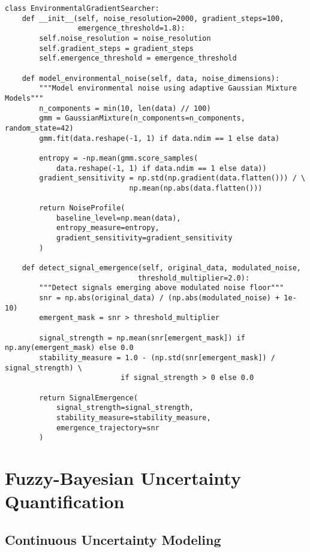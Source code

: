 \documentclass[12pt,a4paper]{article}
\begin{document}
\begin{lstlisting}[style=pythonstyle, caption=Environmental Gradient Search Implementation]
class EnvironmentalGradientSearcher:
    def __init__(self, noise_resolution=2000, gradient_steps=100, 
                 emergence_threshold=1.8):
        self.noise_resolution = noise_resolution
        self.gradient_steps = gradient_steps  
        self.emergence_threshold = emergence_threshold
        
    def model_environmental_noise(self, data, noise_dimensions):
        """Model environmental noise using adaptive Gaussian Mixture Models"""
        n_components = min(10, len(data) // 100)
        gmm = GaussianMixture(n_components=n_components, random_state=42)
        gmm.fit(data.reshape(-1, 1) if data.ndim == 1 else data)
        
        entropy = -np.mean(gmm.score_samples(
            data.reshape(-1, 1) if data.ndim == 1 else data))
        gradient_sensitivity = np.std(np.gradient(data.flatten())) / \
                             np.mean(np.abs(data.flatten()))
        
        return NoiseProfile(
            baseline_level=np.mean(data),
            entropy_measure=entropy,
            gradient_sensitivity=gradient_sensitivity
        )
    
    def detect_signal_emergence(self, original_data, modulated_noise, 
                               threshold_multiplier=2.0):
        """Detect signals emerging above modulated noise floor"""
        snr = np.abs(original_data) / (np.abs(modulated_noise) + 1e-10)
        emergent_mask = snr > threshold_multiplier
        
        signal_strength = np.mean(snr[emergent_mask]) if np.any(emergent_mask) else 0.0
        stability_measure = 1.0 - (np.std(snr[emergent_mask]) / signal_strength) \
                           if signal_strength > 0 else 0.0
        
        return SignalEmergence(
            signal_strength=signal_strength,
            stability_measure=stability_measure,
            emergence_trajectory=snr
        )
\end{lstlisting}

\section{Fuzzy-Bayesian Uncertainty Quantification}

\subsection{Continuous Uncertainty Modeling}
\end{document}
